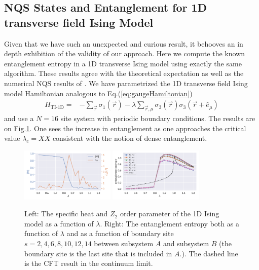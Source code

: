 	\subsection{NQS States and Entanglement for 1D transverse field Ising Model}
	Given that we have such an unexpected and curious result, it behooves an in depth exhibition of the validity of our approach.
	Here we compute the known entanglement entropy in a 1D transverse Ising model using exactly the same algorithm.
	These results agree with the theoretical expectation as well as the numerical NQS results of \cite{Shi_2019}.
	We have parametrized the 1D transverse field Ising model Hamiltonian analogous to Eq.(\eqref{eq:gaugeHamiltonian})
	\begin{align}
		H_{\text{TI-1D}} = &-\sum_{\vec{r}} \sigma_1(\vec{r})
		-\lambda \sum_{\vec{r}, \mu} \sigma_3(\vec{r})\sigma_3(\vec{r}+\hat{e}_\mu)
	\end{align}
	and use a $N=16$ site system
	with periodic boundary conditions.
	The results are on Fig.\ref{fig:TI-1D}. One sees the increase in entanglement as one approaches the critical value $\lambda_c=XX$ consistent with the notion of dense entanglement. 
	\begin{figure}[H]
		\centering
		\includegraphics[width=0.4\textwidth]{figures/chapter3/IsingMagCv.pdf}
		\includegraphics[width=0.4\textwidth]{figures/chapter3/IsingEE.pdf}
		\caption{Left: The specific heat and $Z_2$ order parameter of the 1D Ising model as a function of $\lambda$.
			Right: The entanglement entropy both as a function of $\lambda$ and as a function of boundary site $s=2,4,6,8,10,12,14$ between subsystem $A$ and subsystem $B$ (the boundary site is the last site that is included in $A$.). The dashed line is the CFT result in the continuum limit.}
		\label{fig:TI-1D}
	\end{figure}